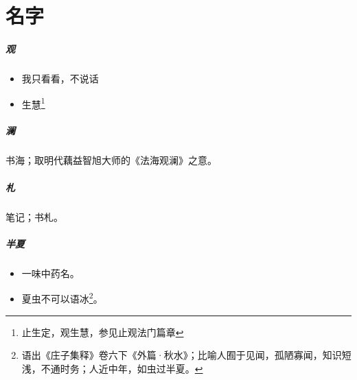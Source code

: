 \chapter{名字}

\paragraph{观}
\begin{itemize}
  \item 我只看看，不说话
  \item 生慧\footnote{止生定，观生慧，参见止观法门篇章}
\end{itemize}

\paragraph{澜}
书海；取明代藕益智旭大师的《法海观澜》之意。

\paragraph{札}
笔记；书札。

\paragraph{半夏}
\begin{itemize}
  \item 一味中药名\smiley。
  \item 夏虫不可以语冰\footnote{语出《庄子集释》卷六下《外篇·秋水》；比喻人囿于见闻，孤陋寡闻，知识短浅，不通时务；人近中年，如虫过半夏。}。
\end{itemize}
